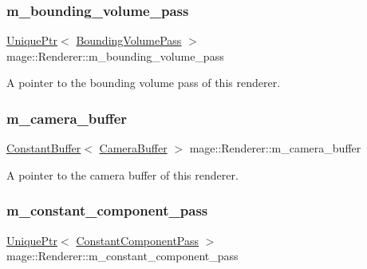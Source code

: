 \subsubsection{\texorpdfstring{m\+\_\+bounding\+\_\+volume\+\_\+pass}{m\_bounding\_volume\_pass}}
{\footnotesize\ttfamily \hyperlink{namespacemage_a3316d7143a973e37adf1110f2e80ca31}{Unique\+Ptr}$<$ \hyperlink{classmage_1_1_bounding_volume_pass}{Bounding\+Volume\+Pass} $>$ mage\+::\+Renderer\+::m\+\_\+bounding\+\_\+volume\+\_\+pass\hspace{0.3cm}{\ttfamily [private]}}

A pointer to the bounding volume pass of this renderer. \hypertarget{classmage_1_1_renderer_ac6ea5b2ff22e051400a693b3f98ef816}{}\label{classmage_1_1_renderer_ac6ea5b2ff22e051400a693b3f98ef816} 
\subsubsection{\texorpdfstring{m\+\_\+camera\+\_\+buffer}{m\_camera\_buffer}}
{\footnotesize\ttfamily \hyperlink{structmage_1_1_constant_buffer}{Constant\+Buffer}$<$ \hyperlink{structmage_1_1_camera_buffer}{Camera\+Buffer} $>$ mage\+::\+Renderer\+::m\+\_\+camera\+\_\+buffer\hspace{0.3cm}{\ttfamily [private]}}

A pointer to the camera buffer of this renderer. \hypertarget{classmage_1_1_renderer_a263748ea2ded028b1885f122e62caf39}{}\label{classmage_1_1_renderer_a263748ea2ded028b1885f122e62caf39} 
\subsubsection{\texorpdfstring{m\+\_\+constant\+\_\+component\+\_\+pass}{m\_constant\_component\_pass}}
{\footnotesize\ttfamily \hyperlink{namespacemage_a3316d7143a973e37adf1110f2e80ca31}{Unique\+Ptr}$<$ \hyperlink{classmage_1_1_constant_component_pass}{Constant\+Component\+Pass} $>$ mage\+::\+Renderer\+::m\+\_\+constant\+\_\+component\+\_\+pass\hspace{0.3cm}{\ttfamily [private]}}

